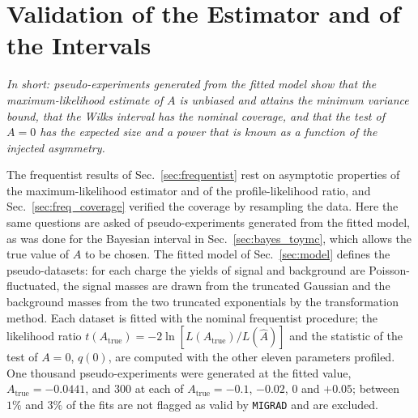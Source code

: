 \section{Validation of the Estimator and of the Intervals}
\label{sec:validation}
\emph{In short: pseudo-experiments generated from the fitted model show that the maximum-likelihood estimate of $A$ is unbiased and attains the minimum variance bound, that the Wilks interval has the nominal coverage, and that the test of $A=0$ has the expected size and a power that is known as a function of the injected asymmetry.}

The frequentist results of Sec.~\ref{sec:frequentist} rest on asymptotic properties of the maximum-likelihood estimator and of the profile-likelihood ratio, and Sec.~\ref{sec:freq_coverage} verified the coverage by resampling the data. Here the same questions are asked of pseudo-experiments generated from the fitted model, as was done for the Bayesian interval in Sec.~\ref{sec:bayes_toymc}, which allows the true value of $A$ to be chosen. The fitted model of Sec.~\ref{sec:model} defines the pseudo-datasets: for each charge the yields of signal and background are Poisson-fluctuated, the signal masses are drawn from the truncated Gaussian and the background masses from the two truncated exponentials by the transformation method. Each dataset is fitted with the nominal frequentist procedure; the likelihood ratio $t(A_{\mathrm{true}})=-2\ln[L(A_{\mathrm{true}})/L(\hat A)]$ and the statistic of the test of $A=0$, $q(0)$, are computed with the other eleven parameters profiled. One thousand pseudo-experiments were generated at the fitted value, $A_{\mathrm{true}}=-0.0441$, and $300$ at each of $A_{\mathrm{true}}=-0.1$, $-0.02$, $0$ and $+0.05$; between $1\%$ and $3\%$ of the fits are not flagged as valid by \texttt{MIGRAD} and are excluded.

